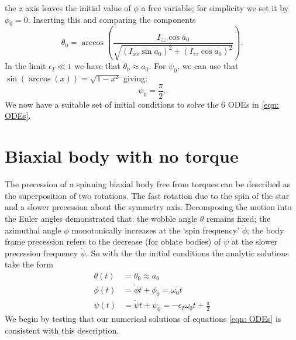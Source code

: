 \documentclass[/home/greg/Thesis/main/main.tex]{subfiles}
\begin{document}
the $z$ axis leaves the initial value of $\phi$ a free variable; for simplicity
we set it by $\phi_{0} = 0$. Inserting this and comparing the components
\begin{equation}
\theta_{0} = \arccos\left(\frac{I_{zz}\cos a_{0}}{ \sqrt{(I_{xx}\sin
        a_{0})^{2} + (I_{zz}\cos a_{0})^{2}}} \right).
\label{eqn: theta init}
\end{equation} 
In the limit $\epsilon_{I} \ll 1$ we have that $\theta_{0} \approx a_{0}$.
For $\psi_0$, we can use that $\sin(\arccos(x)) = \sqrt{1 - x^{2}}$ giving:
\begin{equation}
\psi_0 = \frac{\pi}{2}.
\end{equation}
We now have a suitable set of initial conditions to solve the 6 ODEs in
\eqref{eqn: ODEs}.

\section{Biaxial body with no torque}

The precession of a spinning biaxial body free from torques can be described as
the superposition of two rotations.  The fast rotation due to the spin of the
star and a slower precession about the symmetry axis. Decomposing the motion
into the Euler angles \citet{Jones2001} demonstrated that: the wobble angle
$\theta$ remains fixed; the azimuthal angle $\phi$ monotonically increases at
the `spin frequency' $\dot{\phi}$; the body frame precession refers to the
decrease (for oblate bodies) of $\psi$ at the slower precession frequency
$\dot{\psi}$. So with the the initial conditions the analytic solutions take
the form
\begin{align}
    \theta(t) & = \theta_{0} \approx a_{0} \\
    \phi(t) & = \dot{\phi}t + \phi_{0} = \omega_{0} t \\
    \psi(t) & = \dot{\psi}t + \psi_{0}= -\epsilon_{I}\omega_{0}t+\frac{\pi}{2} 
    \label{eqn: euler angles torque free evolution}
\end{align}
We begin by testing that our numerical solutions of equations
\eqref{eqn: ODEs} is consistent with this description.

\end{document}
